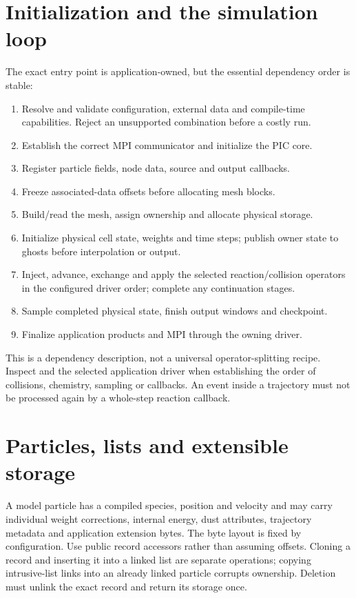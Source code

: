 \section{Initialization and the simulation loop}
The exact entry point is application-owned, but the essential dependency order
is stable:
\begin{enumerate}
\item Resolve and validate configuration, external data and compile-time
capabilities. Reject an unsupported combination before a costly run.
\item Establish the correct MPI communicator and initialize the PIC core.
\item Register particle fields, node data, source and output callbacks.
\item Freeze associated-data offsets before allocating mesh blocks.
\item Build/read the mesh, assign ownership and allocate physical storage.
\item Initialize physical cell state, weights and time steps; publish owner
state to ghosts before interpolation or output.
\item Inject, advance, exchange and apply the selected reaction/collision
operators in the configured driver order; complete any continuation stages.
\item Sample completed physical state, finish output windows and checkpoint.
\item Finalize application products and MPI through the owning driver.
\end{enumerate}
This is a dependency description, not a universal operator-splitting recipe.
Inspect  and the selected application driver
when establishing the order of collisions, chemistry, sampling or callbacks.
An event inside a trajectory must not be processed again by a whole-step
reaction callback.

\section{Particles, lists and extensible storage}
A model particle has a compiled species, position and velocity and may carry
individual weight corrections, internal energy, dust attributes, trajectory
metadata and application extension bytes. The byte layout is fixed by
configuration. Use public record accessors rather than assuming offsets.
Cloning a record and inserting it into a linked list are separate operations;
copying intrusive-list links into an already linked particle corrupts ownership.
Deletion must unlink the exact record and return its storage once.

